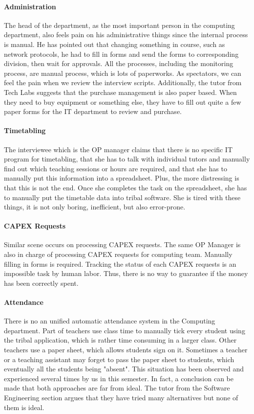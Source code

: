 \paragraph{Administration}
The head of the department, as the most important person in the computing department, also feels pain on his administrative things since the internal process is manual. He has pointed out that changing something in course, such as network protocols, he had to fill in forms and send the forms to corresponding division, then wait for approvals. All the processes, including the monitoring process, are manual process, which is lots of paperworks. As spectators, we can feel the pain when we review the interview scripts. Additionally, the tutor from Tech Labs suggests that the purchase management is also paper based. When they need to buy equipment or something else, they have to fill out quite a few paper forms for the IT department to review and purchase.

\paragraph{Timetabling}
The interviewee which is the OP manager claims that there is no specific IT program for timetabling, that she has to talk with individual tutors and manually find out which teaching sessions or hours are required, and that she has to manually put this information into a spreadsheet. Plus, the more distressing is that this is not the end. Once she completes the task on the spreadsheet, she has to manually put the timetable data into tribal software. She is tired with these things, it is not only boring, inefficient, but also error-prone. 

\paragraph{CAPEX Requests}
Similar scene occurs on processing CAPEX requests. The same OP Manager is also in charge of processing CAPEX requests for computing team. Manually filling in forms is required. Tracking the status of each CAPEX requests is an impossible task by human labor. Thus, there is no way to guarantee if the money has been correctly spent.

\paragraph{Attendance}
There is no an unified automatic attendance system in the Computing department. Part of teachers use class time to manually tick every student using the tribal application, which is rather time consuming in a larger class. Other teachers use a paper sheet, which allows students sign on it. Sometimes a teacher or a teaching assistant may forget to pass the paper sheet to students, which eventually all the students being "absent". This situation has been observed and experienced several times by us in this semester. In fact, a conclusion can be made that both approaches are far from ideal. The tutor from the Software Engineering section argues that they have tried many alternatives but none of them is ideal.

